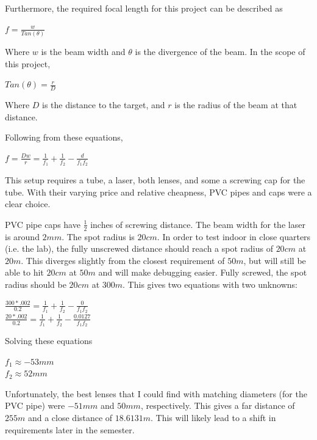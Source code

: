 \documentclass[letterpaper,10pt]{article}
\begin{document}
\begin{spacing}{1.15}
Furthermore, the required focal length for this project can be described as 

\begin{center}
	\large
	$f = \frac{w}{Tan(\theta)}$
\end{center}

Where $w$ is the beam width and $\theta$ is the divergence of the beam. In the scope of this project, 

\begin{center}
	\large
	$Tan(\theta) = \frac{r}{D}$
\end{center}

Where $D$ is the distance to the target, and $r$ is the radius of the beam at that distance. 

Following from these equations, 

\begin{center}
	\large
	$f = \frac{Dw}{r} =  \frac{1}{f_1} + \frac{1}{f_2} - \frac{d}{f_1 f_2}$
\end{center}

This setup requires a tube, a laser, both lenses, and some a screwing cap for the tube. With their varying price and relative cheapness, PVC pipes and caps were a clear choice. 

PVC pipe caps have $\frac{1}{2}$ inches of screwing distance. The beam width for the laser is around $2mm$. The spot radius is $20cm$. In order to test indoor in close quarters (i.e. the lab), the fully unscrewed distance should reach a spot radius of $20cm$ at $20 m$. This diverges slightly from the closest requirement of $50m$, but will still be able to hit $20cm$ at $50m$ and will make debugging easier. Fully screwed, the spot radius should be $20cm$ at $300m$. This gives two equations with two unknowns: 

\begin{center}
	\large
	$\frac{300*.002}{0.2} =  \frac{1}{f_1} + \frac{1}{f_2} - \frac{0}{f_1 f_2}$ \\
	$\frac{20*.002}{0.2} =  \frac{1}{f_1} + \frac{1}{f_2} - \frac{0.0127}{f_1 f_2}$
\end{center}

Solving these equations
\begin{center}
	\large
	$f_1 \approx -53mm$ \\
	$f_2 \approx  52mm$
\end{center}

Unfortunately, the best lenses that I could find with matching diameters (for the PVC pipe) were $-51mm$ and $50mm$, respectively. This gives a far distance of $255 m$ and a close distance of $18.6131 m$. This will likely lead to a shift in requirements later in the semester. 

\end{spacing}
\end{document}
